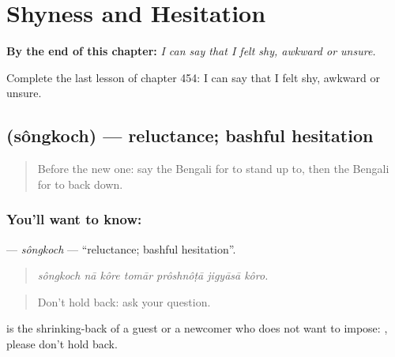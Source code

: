 
\chapter{Shyness and Hesitation}
\label{ch:bn-shyness-and-hesitation}

\begin{chapteropening}
\textbf{By the end of this chapter:} \emph{I can say that I felt shy, awkward or unsure.}

Complete the last lesson of chapter 454: I can say that I felt shy, awkward or unsure.
\end{chapteropening}

\section[\texorpdfstring{\bn{সংকোচ} (sôngkoch)}{সংকোচ (sôngkoch)}]{ (sôngkoch) — reluctance; bashful hesitation}

\label{lesson:BN-C454-songkoch}



\begin{quote}
Before the new one: say the Bengali for to stand up to, then the Bengali for to back down.
\end{quote}

\subsection*{You'll want to know: }
\textbf{} — \emph{sôngkoch} — \textquotedblleft{}reluctance; bashful hesitation\textquotedblright{}.

\begin{quote}
      
\end{quote}

\begin{quote}
\emph{sôngkoch nā kôre tomār prôshnôṭā jigyāsā kôro.}
\end{quote}

\begin{quote}
Don't hold back: ask your question.
\end{quote}

 is the shrinking-back of a guest or a newcomer who does not want to impose:   , please don't hold back.

